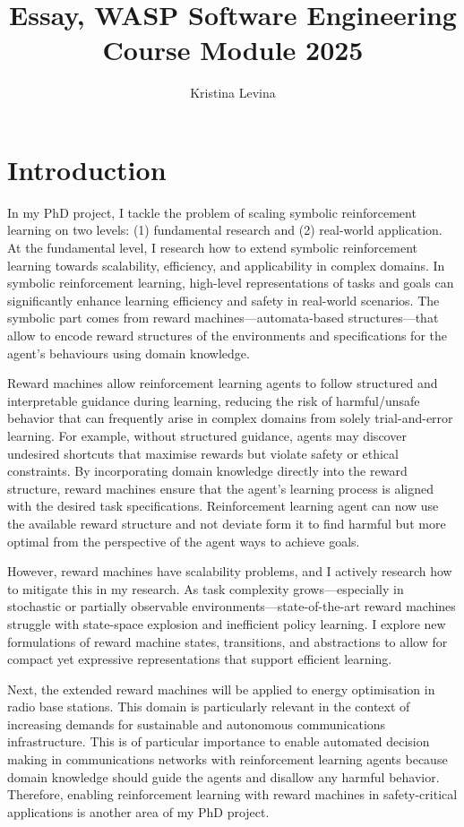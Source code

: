 \documentclass[a4paper,10pt]{article} %
\title{Essay, WASP Software Engineering Course Module 2025}
\author{Kristina Levina}
\date{}
\begin{document}
\maketitle

\section{Introduction}

In my PhD project, I tackle the problem of scaling symbolic reinforcement learning on two levels: (1) fundamental research and (2) real-world application.
At the fundamental level, I research how to extend symbolic reinforcement learning towards scalability, efficiency, and applicability in complex domains.
In symbolic reinforcement learning,  high-level representations of tasks and goals can significantly enhance learning efficiency and safety in real-world scenarios.
The symbolic part comes from reward machines---automata-based structures---that allow to encode reward structures of the environments and specifications for the agent's behaviours using domain knowledge.

Reward machines allow reinforcement learning agents to follow structured and interpretable guidance during learning, reducing the risk of harmful/unsafe behavior that can frequently arise in complex domains from solely trial-and-error learning.
For example, without structured guidance, agents may discover undesired shortcuts that maximise rewards but violate safety or ethical constraints.
By incorporating domain knowledge directly into the reward structure, reward machines ensure that the agent’s learning process is aligned with the desired task specifications.
Reinforcement learning agent can now use the available reward structure and not deviate form it to find harmful but more optimal from the perspective of the agent ways to achieve goals.


However, reward machines have scalability problems, and I actively research how to mitigate this in my research. As task complexity grows---especially in stochastic or partially observable environments---state-of-the-art reward machines struggle with state-space explosion and inefficient policy learning. I explore new formulations of reward machine states, transitions, and abstractions to allow for compact yet expressive representations that support efficient learning.

Next, the extended reward machines will be applied to energy optimisation in radio base stations.
This domain is particularly relevant in the context of increasing demands for sustainable and autonomous communications infrastructure.
This is of particular importance to enable automated decision making in communications networks with reinforcement learning agents because domain knowledge should guide the agents and disallow any harmful behavior.
Therefore, enabling reinforcement learning with reward machines in safety-critical applications is another area of my PhD project.
\end{document}
